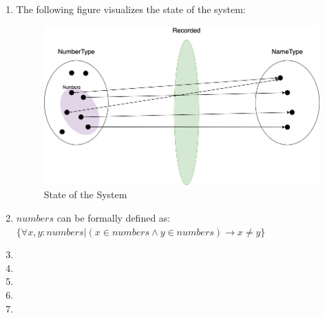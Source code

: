 \begin{enumerate}
    \item The following figure visualizes the state of the system:
        \begin{figure}[h]
        \centering
        \includegraphics[scale=0.45]{images/Diagram.png}
        \caption{State of the System}
        \label{fig:Diagram}
        \end{figure}
    \item $numbers$ can be formally defined as: \\
    $\{ \forall x, y: numbers | (x \in numbers \wedge y \in numbers) \rightarrow x \neq y \}$
    \item
    \item
    \item
    \item
    \item
\end{enumerate}
